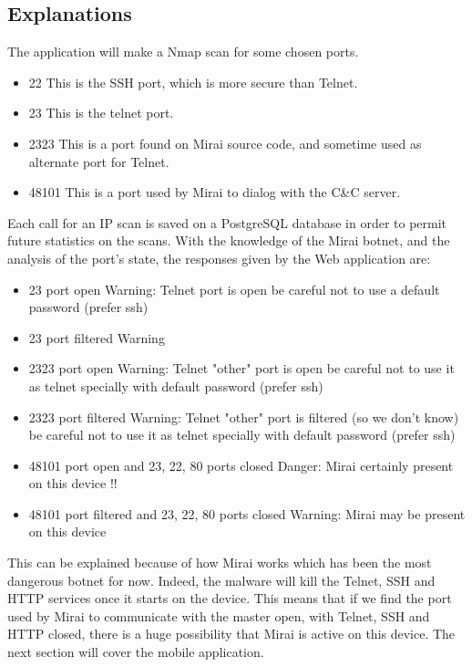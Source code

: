 \documentclass{report}
\begin{document}
\subsection{Explanations}
The application will make a Nmap scan for some chosen ports.
\begin{itemize}
 \item 22 This is the SSH port, which is more secure than Telnet.
 \item 23 This is the telnet port.
 \item 2323 This is a port found on Mirai source code, and sometime used as alternate port for Telnet.
 \item 48101 This is a port used by Mirai to dialog with the C\&C server.
\end{itemize}
Each call for an IP scan is saved on a PostgreSQL\autocite{postgesql} database in order to permit future statistics on the scans. With the knowledge of the Mirai botnet, and the analysis of the port's state, the responses given by the Web application are:
\begin{itemize}
\item 23 port open\newline
  Warning: Telnet port is open be careful not to use a default password (prefer ssh)
\item 23 port filtered\newline
  Warning
\item 2323 port open\newline
  Warning: Telnet "other" port is open be careful not to use it as telnet specially with default password (prefer ssh)
\item 2323 port filtered\newline
  Warning: Telnet "other" port is filtered (so we don't know) be careful not to use it as telnet specially with default password (prefer ssh)
\item 48101 port open and 23, 22, 80 ports closed\newline
  Danger: Mirai certainly present on this device !!
\item 48101 port filtered and 23, 22, 80 ports closed\newline
  Warning: Mirai may be present on this device
\end{itemize}
This can be explained because of how Mirai works which has been the most dangerous botnet for now. Indeed, the malware will kill the Telnet, SSH and HTTP services once it starts on the device. This means that if we find the port used by Mirai to communicate with the master open,  with Telnet, SSH and HTTP closed, there is a huge possibility that Mirai is active on this device.\newline
The next section will cover the mobile application.
\end{document}
